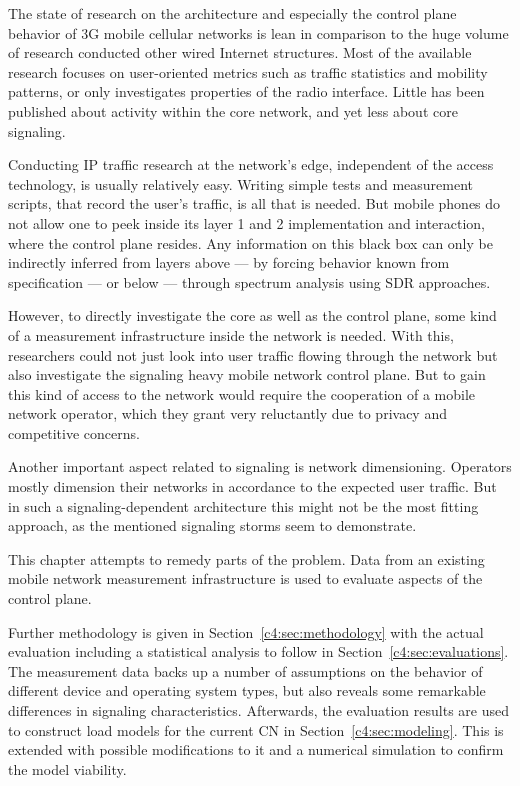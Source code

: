 The state of research on the architecture and especially the control plane behavior of \gls{3G} mobile cellular networks is lean in comparison to the huge volume of research conducted other wired Internet structures. Most of the available research focuses on user-oriented metrics such as traffic statistics and mobility patterns, or only investigates properties of the radio interface. Little has been published about activity within the core network, and yet less about core signaling. 

Conducting \gls{IP} traffic research at the network's edge, independent of the access technology, is usually relatively easy. Writing simple tests and measurement scripts, that record the user's traffic, is all that is needed. But mobile phones do not allow one to peek inside its layer 1 and 2 implementation and interaction, where the control plane resides. Any information on this black box can only be indirectly inferred from layers above --- by forcing behavior known from specification --- or below --- through spectrum analysis using \gls{SDR} approaches. 

However, to directly investigate the core as well as the control plane, some kind of a measurement infrastructure inside the network is needed. With this, researchers could not just look into user traffic flowing through the network but also investigate the signaling heavy mobile network control plane. But to gain this kind of access to the network  would require the cooperation of a mobile network operator, which they grant very reluctantly due to privacy and competitive concerns.

Another important aspect related to signaling is network dimensioning. Operators mostly dimension their networks in accordance to the expected user traffic. But in such a signaling-dependent architecture this might not be the most fitting approach, as the mentioned signaling storms seem to demonstrate. 

This chapter attempts to remedy parts of the problem. Data from an existing mobile network measurement infrastructure is used to evaluate aspects of the control plane. 

%

Further methodology is given in Section~\ref{c4:sec:methodology} with the actual evaluation including a statistical analysis to follow in Section~\ref{c4:sec:evaluations}. The measurement data backs up a number of assumptions on the behavior of different device and operating system types, but also reveals some remarkable differences in signaling characteristics. Afterwards, the evaluation results are used to construct load models for the current \gls{CN} in Section~\ref{c4:sec:modeling}. This is extended with possible modifications to it and a numerical simulation to confirm the model viability.

